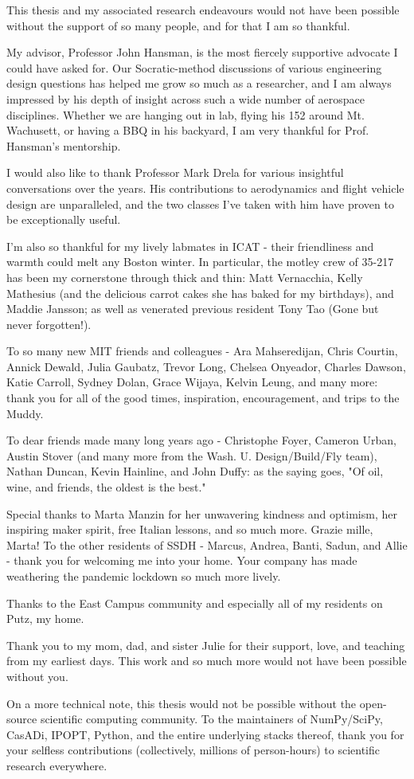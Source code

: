 This thesis and my associated research endeavours would not have been possible without the support of so many people, and for that I am so thankful.

My advisor, Professor John Hansman, is the most fiercely supportive advocate I could have asked for. Our Socratic-method discussions of various engineering design questions has helped me grow so much as a researcher, and I am always impressed by his depth of insight across such a wide number of aerospace disciplines. Whether we are hanging out in lab, flying his 152 around Mt. Wachusett, or having a BBQ in his backyard, I am very thankful for Prof. Hansman's mentorship.

I would also like to thank Professor Mark Drela for various insightful conversations over the years. His contributions to aerodynamics and flight vehicle design are unparalleled, and the two classes I've taken with him have proven to be exceptionally useful.

I'm also so thankful for my lively labmates in ICAT - their friendliness and warmth could melt any Boston winter. In particular, the motley crew of 35-217 has been my cornerstone through thick and thin: Matt Vernacchia, Kelly Mathesius (and the delicious carrot cakes she has baked for my birthdays), and Maddie Jansson; as well as venerated previous resident Tony Tao (Gone but never forgotten!).

To so many new MIT friends and colleagues - Ara Mahseredijan, Chris Courtin, Annick Dewald, Julia Gaubatz, Trevor Long, Chelsea Onyeador, Charles Dawson, Katie Carroll, Sydney Dolan, Grace Wijaya, Kelvin Leung, and many more: thank you for all of the good times, inspiration, encouragement, and trips to the Muddy.

To dear friends made many long years ago - Christophe Foyer, Cameron Urban, Austin Stover (and many more from the Wash. U. Design/Build/Fly team), Nathan Duncan, Kevin Hainline, and John Duffy: as the saying goes, "Of oil, wine, and friends, the oldest is the best."

Special thanks to Marta Manzin for her unwavering kindness and optimism, her inspiring maker spirit, free Italian lessons, and so much more. Grazie mille, Marta! To the other residents of SSDH - Marcus, Andrea, Banti, Sadun, and Allie - thank you for welcoming me into your home. Your company has made weathering the pandemic lockdown so much more lively.

Thanks to the East Campus community and especially all of my residents on Putz, my home.

Thank you to my mom, dad, and sister Julie for their support, love, and teaching from my earliest days. This work and so much more would not have been possible without you.

On a more technical note, this thesis would not be possible without the open-source scientific computing community. To the maintainers of NumPy/SciPy, CasADi, IPOPT, Python, and the entire underlying stacks thereof, thank you for your selfless contributions (collectively, millions of person-hours) to scientific research everywhere.



